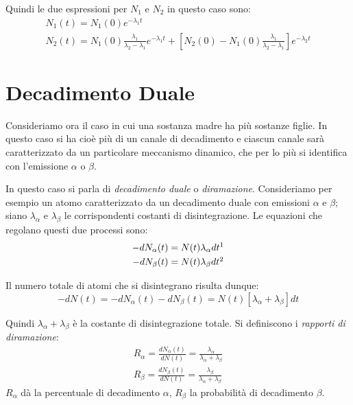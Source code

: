 Quindi le due espressioni per $N_1$ e $N_2$ in questo 
caso sono:
\begin{gather}
N_1(t)=N_1(0)e^{-\lambda_1t}\\
N_2(t)=N_1(0)\frac{\lambda_1}{\lambda_2-\lambda_1}e^{-\lambda_1t}+[N_2(0)-N_1(0)
\frac{\lambda_1}{\lambda_2-\lambda_1}]e^{-\lambda_2t}
\end{gather}
\section{Decadimento Duale}
Consideriamo ora il caso in cui una sostanza madre ha più sostanze figlie.
In questo caso si ha cioè più di un canale di decadimento e ciascun canale 
sarà caratterizzato da un particolare meccanismo dinamico,
che per lo più si identifica con l'emissione $\alpha$ o $\beta$.

In questo caso si parla di \textit{decadimento duale} o \textit{diramazione}.
Consideriamo per esempio un atomo caratterizzato da un decadimento duale con 
emissioni $\alpha$ e $\beta$;
siano $\lambda_{\alpha}$ e $\lambda_{\beta}$ le corrispondenti costanti di 
disintegrazione.
Le equazioni che regolano questi due processi sono:
\begin{gather}
-dN_{\alpha}(t)=N(t)\lambda_{\alpha}dt\footnotemark\\
-dN_{\beta}(t)=N(t)\lambda_{\beta}dt\footnotemark
\end{gather}

\addtocounter{footnote}{-1}

Il numero totale di atomi che si disintegrano risulta dunque:
\begin{equation}
-dN(t)=-dN_{\alpha}(t)-dN_{\beta}(t)=N(t)[\lambda_{\alpha}+\lambda_{\beta}]dt
\end{equation}

Quindi $\lambda_{\alpha}+\lambda_{\beta}$ è la costante di disintegrazione 
totale. Si definiscono i \textit{rapporti di diramazione}:
\begin{gather}
R_{\alpha}=\frac{dN_{\alpha}(t)}{dN(t)}=\frac{\lambda_{\alpha}}{\lambda_{\alpha}
+\lambda_{\beta}}\\
R_{\beta}=\frac{dN_{\beta}(t)}{dN(t)}=\frac{\lambda_{\beta}}{\lambda_{\alpha}+
\lambda_{\beta}}
\end{gather}
$R_{\alpha}$ dà la percentuale di decadimento $\alpha$, $R_{\beta}$ la 
probabilità di decadimento $\beta$.

